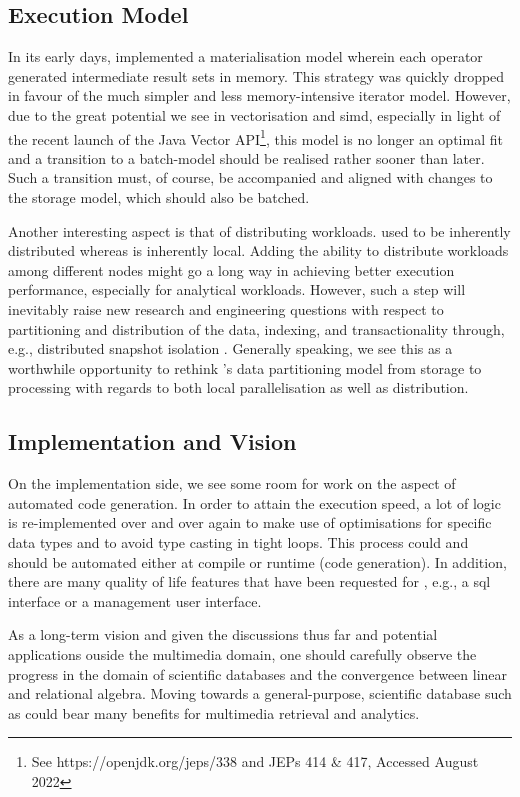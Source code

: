 \subsection{Execution Model}
In its early days, \cottontail{} implemented a materialisation model wherein each operator generated intermediate result sets in memory. This strategy was quickly dropped in favour of the much simpler and less memory-intensive iterator model. However, due to the great potential we see in vectorisation and \acrshort{simd}, especially in light of the recent launch of the Java Vector API\footnote{See https://openjdk.org/jeps/338 and JEPs 414 \& 417, Accessed August 2022}, this model is no longer an optimal fit and a transition to a batch-model should be realised rather sooner than later. Such a transition must, of course, be accompanied and aligned with changes to the storage model, which should also be batched.

Another interesting aspect is that of distributing workloads. \adampro{} used to be inherently distributed \cite{Giangreco:2016Adam,Giangreco:2018Database} whereas \cottontail{} is inherently local. Adding the ability to distribute workloads among different nodes might go a long way in achieving better execution performance, especially for analytical workloads. However, such a step will inevitably raise new research and engineering questions with respect to partitioning and distribution of the data, indexing, and transactionality through, e.g., distributed snapshot isolation \cite{Binnig:2014Distributed}. Generally speaking, we see this as a worthwhile opportunity to rethink \cottontail's data partitioning model from storage to processing with regards to both local parallelisation as well as distribution.

\subsection{Implementation and Vision}
On the implementation side, we see some room for work on the aspect of automated code generation. In order to attain the execution speed, a lot of logic is re-implemented over and over again to make use of optimisations for specific data types and to avoid type casting in tight loops. This process could and should be automated either at compile or runtime (code generation). In addition, there are many quality of life features that have been requested for \cottontail{}, e.g., a \acrshort{sql} interface or a management user interface.

As a long-term vision and given the discussions thus far and potential applications ouside the multimedia domain, one should carefully observe the progress in the domain of scientific databases and the convergence between linear and relational algebra. Moving towards a general-purpose, scientific database such as \cite{Stonebraker:2013SciDB,Luo:2018Scalable,Blacher:2022Machine} could bear many benefits for multimedia retrieval and analytics.